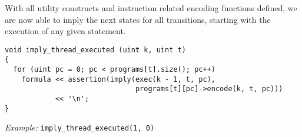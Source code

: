 

\noindent
With all utility constructs and instruction related encoding functions defined, we are now able to imply the next states for all transitions, starting with the execution of any given statement.

\begin{lstlisting}[style=c++]
void imply_thread_executed (uint k, uint t)
{
  for (uint pc = 0; pc < programs[t].size(); pc++)
    formula << assertion(imply(exec(k - 1, t, pc),
                               programs[t][pc]->encode(k, t, pc)))
            << '\n';
}
\end{lstlisting}

\noindent
\emph{Example:} \lstinline[style=c++]{imply_thread_executed(1, 0)}

